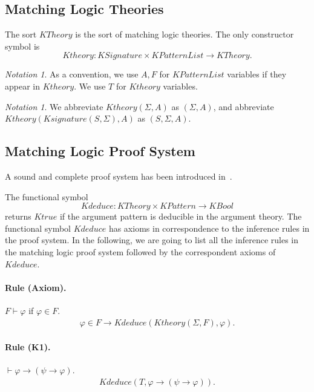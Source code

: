 \documentclass[UTF8]{article}
\newcounter{thmcounter}
\theoremstyle{plain}
\theoremstyle{definition}
\theoremstyle{remark}
\newtheorem{notation}[thmcounter]{Notation}
\newcommand{\KBool}{\mathit{KBool}}
\newcommand{\Ktrue}{\mathit{Ktrue}}
\newcommand{\KPattern}{\mathit{KPattern}}
\newcommand{\KPatternList}{\mathit{KPatternList}}
\newcommand{\kimplies}{\to}
\newcommand{\KSignature}{\mathit{KSignature}}
\newcommand{\Ksignature}{\mathit{Ksignature}}
\newcommand{\KTheory}{\mathit{KTheory}}
\newcommand{\Ktheory}{\mathit{Ktheory}}
\newcommand{\Kdeduce}{\mathit{Kdeduce}}
\begin{document}
\subsection{Matching Logic Theories}

The sort $\KTheory$ is the sort of matching logic theories. The only constructor symbol is 
$$\Ktheory \colon \KSignature \times \KPatternList \to \KTheory.$$

\begin{notation}
	As a convention, we use $A, F$ for $\KPatternList$ variables if they appear in $\Ktheory$. We use $T$ for $\Ktheory$ variables.
\end{notation}
\begin{notation}
	We abbreviate $\Ktheory(\Sigma, A)$ as $(\Sigma, A)$, and abbreviate $\Ktheory(\Ksignature(S, \Sigma), A)$ as $(S, \Sigma, A)$. 
\end{notation}

\subsection{Matching Logic Proof System}

A sound and complete proof system has been introduced in~\cite{?}. 

The functional symbol
$$
\Kdeduce \colon \KTheory \times \KPattern \to \KBool
$$
returns $\Ktrue$ if the argument pattern is deducible in the argument theory.
The functional symbol $\Kdeduce$ has axioms in correspondence to the inference rules in the proof system.
In the following, we are going to list all the inference rules in the matching logic proof system followed by the correspondent axioms of $\Kdeduce$.

\paragraph{Rule (Axiom).}
$F \vdash \varphi$ if $\varphi \in F$.
\begin{align*}
\varphi \in F \to \Kdeduce(\Ktheory(\Sigma, F), \varphi).
\end{align*}

\paragraph{Rule (K1).}
$\vdash \varphi \to (\psi \to \varphi)$.
\begin{align*}
\Kdeduce(T, \varphi \kimplies (\psi \kimplies \varphi)).
\end{align*}
\end{document}
